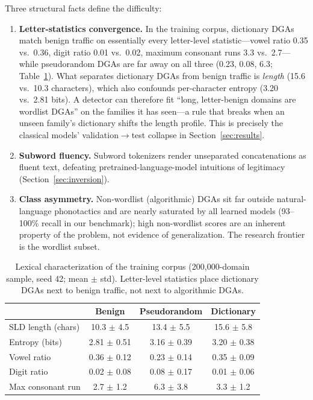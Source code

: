 \documentclass[conference]{IEEEtran}
\begin{document}
Three structural facts define the difficulty:
\begin{enumerate}
\item \textbf{Letter-statistics convergence.} In the training corpus, dictionary DGAs match benign traffic on essentially every letter-level statistic---vowel ratio 0.35 vs.\ 0.36, digit ratio 0.01 vs.\ 0.02, maximum consonant runs 3.3 vs.\ 2.7---while pseudorandom DGAs are far away on all three (0.23, 0.08, 6.3; Table~\ref{tab:lexical}). What separates dictionary DGAs from benign traffic is \emph{length} (15.6 vs.\ 10.3 characters), which also confounds per-character entropy (3.20 vs.\ 2.81 bits). A detector can therefore fit ``long, letter-benign domains are wordlist DGAs'' on the families it has seen---a rule that breaks when an unseen family's dictionary shifts the length profile. This is precisely the classical models' validation$\to$test collapse in Section~\ref{sec:results}.
\item \textbf{Subword fluency.} Subword tokenizers render unseparated concatenations as fluent text, defeating pretrained-language-model intuitions of legitimacy (Section~\ref{sec:inversion}).
\item \textbf{Class asymmetry.} Non-wordlist (algorithmic) DGAs sit far outside natural-language phonotactics and are nearly saturated by all learned models (93--100\% recall in our benchmark); high non-wordlist scores are an inherent property of the problem, not evidence of generalization. The research frontier is the wordlist subset.
\end{enumerate}

\begin{table}[t]
\centering
\caption{Lexical characterization of the training corpus (200{,}000-domain sample, seed 42; mean $\pm$ std). Letter-level statistics place dictionary DGAs next to benign traffic, not next to algorithmic DGAs.}
\label{tab:lexical}
\footnotesize
\setlength{\tabcolsep}{5pt}
\begin{tabular}{@{}lccc@{}}
\toprule
 & Benign & Pseudorandom & Dictionary \\
\midrule
SLD length (chars) & 10.3 $\pm$ 4.5 & 13.4 $\pm$ 5.5 & 15.6 $\pm$ 5.8 \\
Entropy (bits) & 2.81 $\pm$ 0.51 & 3.16 $\pm$ 0.39 & 3.20 $\pm$ 0.38 \\
Vowel ratio & 0.36 $\pm$ 0.12 & 0.23 $\pm$ 0.14 & 0.35 $\pm$ 0.09 \\
Digit ratio & 0.02 $\pm$ 0.08 & 0.08 $\pm$ 0.17 & 0.01 $\pm$ 0.06 \\
Max consonant run & 2.7 $\pm$ 1.2 & 6.3 $\pm$ 3.8 & 3.3 $\pm$ 1.2 \\
\bottomrule
\end{tabular}
\end{table}
\end{document}
